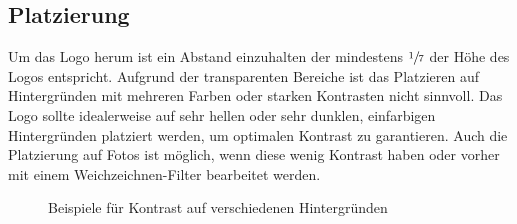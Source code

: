 \documentclass{article}
\begin{document}
\subsection{Platzierung}

Um das Logo herum ist ein Abstand einzuhalten der mindestens $\sfrac{1}{7}$ der Höhe des Logos entspricht.
Aufgrund der transparenten Bereiche ist das Platzieren auf Hintergründen mit mehreren Farben oder starken Kontrasten nicht sinnvoll.
Das Logo sollte idealerweise auf sehr hellen oder sehr dunklen, einfarbigen Hintergründen platziert werden, um optimalen Kontrast zu garantieren.
Auch die Platzierung auf Fotos ist möglich, wenn diese wenig Kontrast haben oder vorher mit einem Weichzeichnen-Filter bearbeitet werden.

\begin{figure}[H]
\begin{centering}
\hfill
{}
\hfill

\hfill
{}
\hfill
\end{centering}
\caption{Beispiele für Kontrast auf verschiedenen Hintergründen}
\end{figure}
\end{document}
